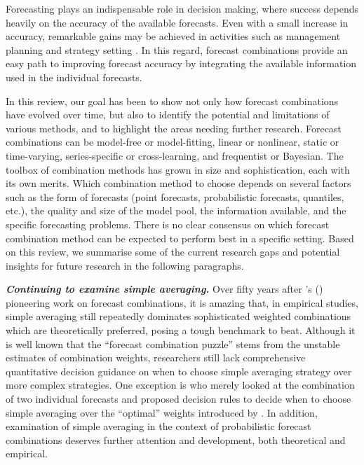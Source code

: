 \documentclass[a4paper,11pt]{article}
\def\citeapos#1{\citeauthor{#1}'s (\citeyear{#1})}
\begin{document}
Forecasting plays an indispensable role in decision making, where success depends heavily on the accuracy of the available forecasts. Even with a small increase in accuracy, remarkable gains may be achieved in activities such as management planning and strategy setting \citep{Makridakis1996-cf,Syntetos2009-ho}. In this regard, forecast combinations provide an easy path to improving forecast accuracy by integrating the available information used in the individual forecasts.

In this review, our goal has been to show not only how forecast combinations have evolved over time, but also to identify the potential and limitations of various methods, and to highlight the areas needing further research. Forecast combinations can be model-free or model-fitting, linear or nonlinear, static or time-varying, series-specific or cross-learning, and frequentist or Bayesian. The toolbox of combination methods has grown in size and sophistication, each with its own merits. Which combination method to choose depends on several factors such as the form of forecasts (point forecasts, probabilistic forecasts, quantiles, etc.), the quality and size of the model pool, the information available, and the specific forecasting problems. There is no clear consensus on which forecast combination method can be expected to perform best in a specific setting. Based on this review, we summarise some of the current research gaps and potential insights for future research in the following paragraphs.

\textbf{\textit{Continuing to examine simple averaging.}} Over fifty years after \citeapos{Bates1969-yj} pioneering work on forecast combinations, it is amazing that, in empirical studies, simple averaging still repeatedly dominates sophisticated weighted combinations which are theoretically preferred, posing a tough benchmark to beat. Although it is well known that the ``forecast combination puzzle'' stems from the unstable estimates of combination weights, researchers still lack comprehensive quantitative decision guidance on when to choose simple averaging strategy over more complex strategies. One exception is \citet{Blanc2016-sn} who merely looked at the combination of two individual forecasts and proposed decision rules to decide when to choose simple averaging over the ``optimal'' weights introduced by \citet{Bates1969-yj}. In addition, examination of simple averaging in the context of probabilistic forecast combinations deserves further attention and development, both theoretical and empirical.
\end{document}
